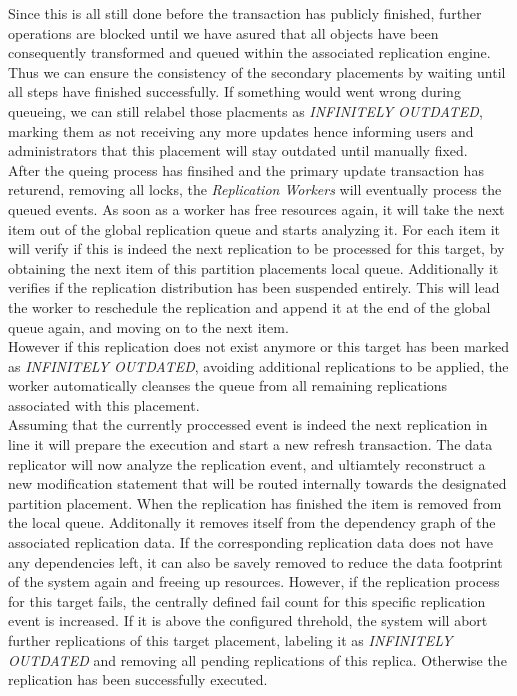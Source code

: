 Since this is all still done before the transaction has publicly finished, further operations are blocked until we have asured that all objects have been consequently 
transformed and queued within the associated replication engine. Thus we can ensure the consistency of the secondary placements by waiting until all steps have finished 
successfully. If something would went wrong during queueing, we can still relabel those placments as \emph{INFINITELY OUTDATED}, marking them as not receiving any more updates 
hence informing users and administrators that this placement will stay outdated until manually fixed.\\

After the queing process has finsihed and the primary update transaction has returend, removing all locks, the \emph{Replication Workers} will eventually process the queued events.
As soon as a worker has free resources again, it will take the next item out of the global replication queue and starts analyzing it.
For each item it will verify if this is indeed the next replication to be processed for this target, by obtaining the next item of this partition placements local queue.
Additionally it verifies if the replication distribution has been suspended entirely. This will lead the worker to reschedule the replication
and append it at the end of the global queue again, and moving on to the next item.\\
However if this replication does not exist anymore or this target has been marked as \emph{INFINITELY OUTDATED}, avoiding additional replications to be applied,
the worker automatically cleanses the queue from all remaining replications associated with this placement.\\
Assuming that the currently proccessed event is indeed the next replication in line it will prepare the execution and start a new refresh transaction. 
The data replicator will now analyze the replication event, and ultiamtely reconstruct a new modification statement that will be routed internally towards 
the designated partition placement.
When the replication has finished the item is removed from the local queue. Additonally it removes itself from the dependency graph of the associated replication data.
If the corresponding replication data does not have any dependencies left, it can also be savely removed to reduce the data footprint of the system again and freeing up resources.
However, if the replication process for this target fails, the centrally defined fail count for this specific replication event is increased. 
If it is above the configured threhold, the system will abort further replications of this target placement, labeling it as \emph{INFINITELY OUTDATED} and removing all pending
replications of this replica. Otherwise the replication has been successfully executed.\\

